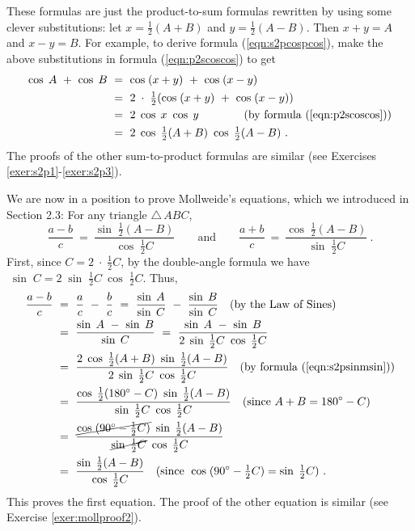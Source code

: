 These formulas are just the product-to-sum formulas rewritten by using some clever
substitutions: let $x=\frac{1}{2}(A+B)$ and $y=\frac{1}{2}(A-B)$. Then $x+y=A$ and $x-y=B$.
For example, to derive formula (\ref{eqn:s2pcospcos}), make the above substitutions in formula
(\ref{eqn:p2scoscos}) to get
\begin{align*}
 \cos\;A ~+~ \cos\;B ~&=~ \cos\;(x+y) ~+~ \cos\;(x-y)\\
 &=~ 2\;\cdot\;\tfrac{1}{2}(\cos\;(x+y) ~+~ \cos\;(x-y))\\
 &=~ 2\;\cos\;x~\cos\;y\qquad\qquad\text{(by formula (\ref{eqn:p2scoscos}))}\\
 &=~ 2\;\cos\;\tfrac{1}{2}(A+B)~\cos\;\tfrac{1}{2}(A-B) ~.
\end{align*}
The proofs of the other sum-to-product formulas are similar (see Exercises
\ref{exer:s2p1}-\ref{exer:s2p3}).
\newpage
\begin{exmp}\label{exmp:mollweideproof}
 We are now in a position to prove Mollweide's equations, which we introduced in Section 2.3: For
 any triangle $\triangle\,ABC$,
 \begin{displaymath}
  \frac{a-b}{c} ~=~ \frac{\sin\;\frac{1}{2}(A-B)}{\cos\;\frac{1}{2}C} \qquad\text{and}\qquad
  \frac{a+b}{c} ~=~ \frac{\cos\;\frac{1}{2}(A-B)}{\sin\;\frac{1}{2}C} ~.
 \end{displaymath}
 First, since $C=2\;\cdot\;\tfrac{1}{2}C$, by the double-angle formula we have
 $\;\sin\;C = 2\;\sin\;\tfrac{1}{2}C~\cos\;\tfrac{1}{2}C$. Thus,
 \begin{align*}
  \frac{a-b}{c} ~&=~ \frac{a}{c} ~-~ \frac{b}{c}
  ~=~ \frac{\sin\;A}{\sin\;C} ~-~ \frac{\sin\;B}{\sin\;C}\quad\text{(by the Law of Sines)}\\
  &=~ \frac{\sin\;A ~-~ \sin\;B}{\sin\;C} ~=~
   \frac{\sin\;A ~-~ \sin\;B}{2\;\sin\;\tfrac{1}{2}C~\cos\;\tfrac{1}{2}C}\\
  &=~ \frac{2\;\cos\;\tfrac{1}{2}(A+B)~\sin\;\tfrac{1}{2}(A-B)}{2\;\sin\;\tfrac{1}{2}C~
   \cos\;\tfrac{1}{2}C}\quad\text{(by formula (\ref{eqn:s2psinmsin}))}\\
  &=~ \frac{\cos\;\tfrac{1}{2}(180^\circ - C)~\sin\;\tfrac{1}{2}(A-B)}{\sin\;\tfrac{1}{2}C~
   \cos\;\tfrac{1}{2}C}\quad\text{(since $A+B=180^\circ - C$)}\\
  &=~ \frac{\cancel{\cos\;(90^\circ - \tfrac{1}{2}C)}~\sin\;\tfrac{1}{2}(A-B)}{
  \cancel{\sin\;\tfrac{1}{2}C}~\cos\;\tfrac{1}{2}C}\\
  &=~ \frac{\sin\;\frac{1}{2}(A-B)}{\cos\;\frac{1}{2}C}\quad\text{(since $\;\cos\;(90^\circ -
   \tfrac{1}{2}C) = \sin\;\tfrac{1}{2}C$)}~.
 \end{align*}
 This proves the first equation. The proof of the other equation is similar (see Exercise
 \ref{exer:mollproof2}).
\end{exmp}
